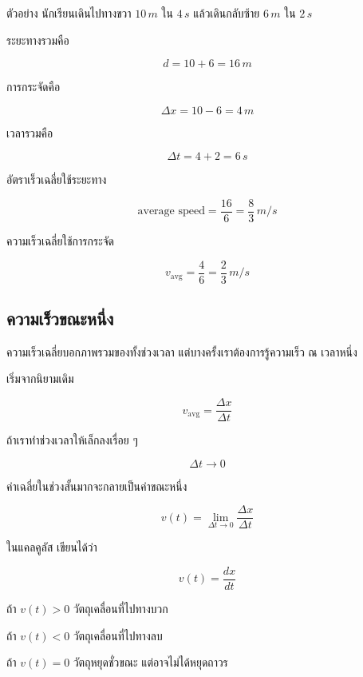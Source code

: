 \documentclass[12pt,a4paper]{report}
\begin{document}
\begin{examplebox}{ตัวอย่าง}
นักเรียนเดินไปทางขวา $10\,\si{m}$ ใน $4\,\si{s}$ แล้วเดินกลับซ้าย $6\,\si{m}$ ใน $2\,\si{s}$

ระยะทางรวมคือ

\[
d=10+6=16\,\si{m}
\]

การกระจัดคือ

\[
\Delta x=10-6=4\,\si{m}
\]

เวลารวมคือ

\[
\Delta t=4+2=6\,\si{s}
\]

อัตราเร็วเฉลี่ยใช้ระยะทาง

\[
\text{average speed}=\frac{16}{6}=\frac{8}{3}\,\si{m/s}
\]

ความเร็วเฉลี่ยใช้การกระจัด

\[
v_{\text{avg}}=\frac{4}{6}=\frac{2}{3}\,\si{m/s}
\]
\end{examplebox}

\subsection{ความเร็วขณะหนึ่ง}

ความเร็วเฉลี่ยบอกภาพรวมของทั้งช่วงเวลา แต่บางครั้งเราต้องการรู้ความเร็ว ณ เวลาหนึ่ง

เริ่มจากนิยามเดิม

\[
v_{\text{avg}}=\frac{\Delta x}{\Delta t}
\]

ถ้าเราทำช่วงเวลาให้เล็กลงเรื่อย ๆ

\[
\Delta t \to 0
\]

ค่าเฉลี่ยในช่วงสั้นมากจะกลายเป็นค่าขณะหนึ่ง

\[
v(t)=\lim_{\Delta t\to 0}\frac{\Delta x}{\Delta t}
\]

ในแคลคูลัส เขียนได้ว่า

\[
v(t)=\frac{dx}{dt}
\]

\begin{tcolorbox}[title=การแปลความหมายของเครื่องหมาย]
ถ้า $v(t)>0$ วัตถุเคลื่อนที่ไปทางบวก

ถ้า $v(t)<0$ วัตถุเคลื่อนที่ไปทางลบ

ถ้า $v(t)=0$ วัตถุหยุดชั่วขณะ แต่อาจไม่ได้หยุดถาวร
\end{tcolorbox}
\end{document}
